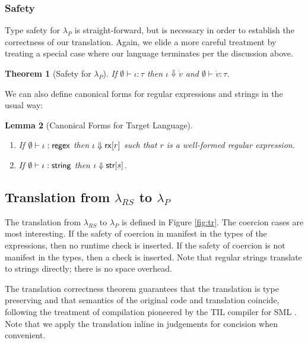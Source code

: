 \documentclass[9pt]{sig-alternate}
\newtheorem{thm}{Theorem}
\newtheorem{lem}[thm]{Lemma}
\theoremstyle{definition}
\newcommand{\lambdas}{\lambda_{RS}}
\newcommand{\lambdap}{\lambda_P}
\renewcommand{\tstr}[1]{{{\sf str}[#1]}}
\newcommand{\rx}[1]{ {\sf rx}[#1] }
\newcommand{\str}{{\sf string}}
\newcommand{\regex}{{\sf regex}}
\newcommand{\treduces}{ \Downarrow }
\newcommand{\sreduces}{ \Downarrow }
\begin{document}
\subsubsection{Safety}

Type safety for $\lambdap$ is straight-forward, but is necessary in order to establish the 
correctness of our translation.
Again, we elide a more careful treatment by treating a special case where our language terminates per the discussion above.

\begin{thm}[Safety for $\lambdap$] If $\emptyset \vdash \iota : \tau$ 
  then $\iota \sreduces \dot v$ and $\emptyset \vdash \dot v : \tau$.
\end{thm}

We can also define canonical forms for regular expressions and strings in the usual way:


\begin{lem}[Canonical Forms for Target Language]
~
\begin{enumerate}
\item 
If $\emptyset \vdash \iota : \regex$ then $\iota \treduces \rx{r}$ such that $r$ is a well-formed regular expression. 
\item 
If $\emptyset \vdash \iota : \str$ then $\iota \treduces \tstr{s}$.
\end{enumerate}
\end{lem}

\subsection{Translation from $\lambdas$ to $\lambdap$}\label{sec:tr}


The translation from $\lambdas$ to $\lambdap$ is defined in Figure \ref{fig:tr}.
The coercion cases are most interesting. If the safety of coercion in manifest in the
types of the expressions, then no runtime check is inserted.
If the safety of coercion is not manifest in the types, then a check is inserted. Note that regular strings translate to strings directly; there is no space overhead.

The translation correctness theorem guarantees that the translation is type preserving and that semantics of the original code and translation coincide, following the treatment of compilation pioneered by the TIL compiler for SML \cite{tarditi+:til-OLD}. Note that we apply the translation inline in judgements for concision when convenient. 
\end{document}
